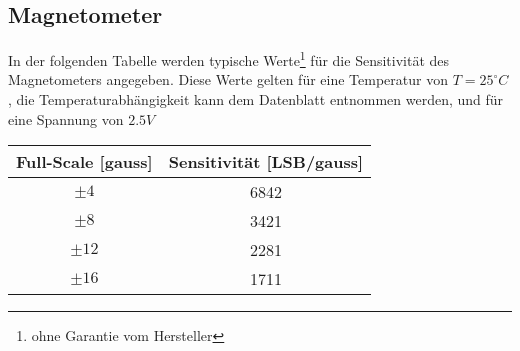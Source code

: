 \documentclass[a4paper, 12pt]{article}
\begin{document}
\subsection*{Magnetometer}In der folgenden Tabelle werden typische Werte\footnote{ohne Garantie vom Hersteller} für die Sensitivität des Magnetometers angegeben.
Diese Werte gelten für eine Temperatur von $T = 25^\circ C$, die Temperaturabhängigkeit kann dem Datenblatt entnommen werden, und für eine Spannung von $2.5 V$
\begin{center}
	\begin{tabular}{c | c}
		Full-Scale [gauss] & Sensitivität [LSB/gauss]\\\hline
		$\pm 4$ & 6842\\
		$\pm 8$ & 3421\\
		$\pm 12$ & 2281\\
		$\pm 16$ & 1711
	\end{tabular}
\end{center}
\end{document}
